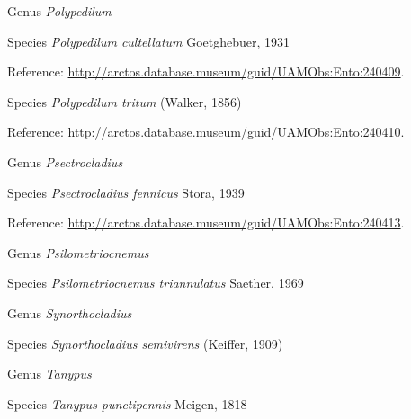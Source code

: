 \documentclass[9pt, article]{memoir}
\begin{document}
\begin{multicols}{2}
\vspace{6pt}\noindent\hspace{30pt}Genus \textit{Polypedilum}


\vspace{6pt}\noindent\hspace{36pt}Species \textit{Polypedilum cultellatum} Goetghebuer, 1931


\vspace{6pt}Reference: 
\url{http://arctos.database.museum/guid/UAMObs:Ento:240409}.

\vspace{6pt}\noindent\hspace{36pt}Species \textit{Polypedilum tritum} (Walker, 1856)


\vspace{6pt}Reference: 
\url{http://arctos.database.museum/guid/UAMObs:Ento:240410}.

\vspace{6pt}\noindent\hspace{30pt}Genus \textit{Psectrocladius}


\vspace{6pt}\noindent\hspace{36pt}Species \textit{Psectrocladius fennicus} Stora, 1939


\vspace{6pt}Reference: 
\url{http://arctos.database.museum/guid/UAMObs:Ento:240413}.

\vspace{6pt}\noindent\hspace{30pt}Genus \textit{Psilometriocnemus}


\vspace{6pt}\noindent\hspace{36pt}Species \textit{Psilometriocnemus triannulatus} Saether, 1969


\vspace{6pt}\noindent\hspace{30pt}Genus \textit{Synorthocladius}


\vspace{6pt}\noindent\hspace{36pt}Species \textit{Synorthocladius semivirens} (Keiffer, 1909)


\vspace{6pt}\noindent\hspace{30pt}Genus \textit{Tanypus}


\vspace{6pt}\noindent\hspace{36pt}Species \textit{Tanypus punctipennis} Meigen, 1818



\end{multicols}
\end{document}
